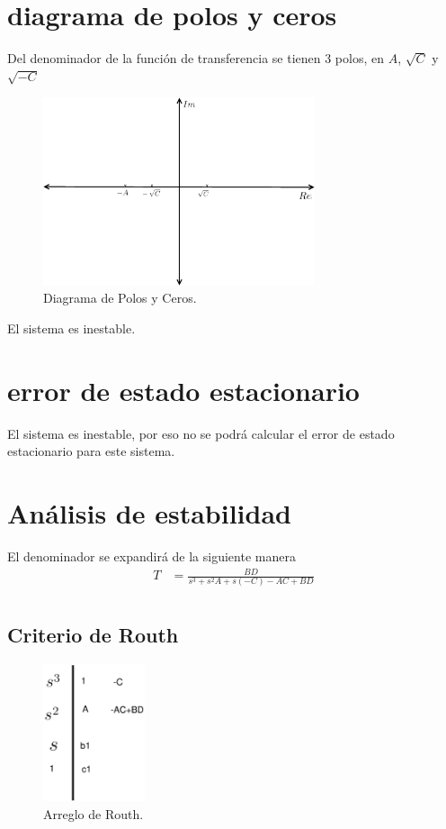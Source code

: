 \documentclass[a4paper]{IEEEtran} %
\begin{document}
\section{diagrama de polos y ceros}
Del denominador de la función de transferencia se tienen 3 polos, en $A$, $\sqrt{C}$ y $\sqrt{-C}$

\begin{figure}[h]
    \centering
        \includegraphics[width=8cm]{images/polos_ceros.eps}
        \caption{Diagrama de Polos y Ceros.}
\end{figure}

El sistema es inestable.
\section{error de estado estacionario}
El sistema es inestable, por eso no se podrá calcular el error de estado estacionario para este sistema.
\section{Análisis de estabilidad}
El denominador se expandirá de la siguiente manera
\begin{equation}
    \begin{split}
        T&=\frac{BD}{s^3+s^2A+s(-C)-AC+BD}\\
    \end{split}
    \label{eq:m_sensiclose}
\end{equation}
\subsection{Criterio de Routh}
\begin{figure}[h]
    \centering
        \includegraphics[width=3cm]{images/routh.eps}
        \caption{Arreglo de Routh.}
\end{figure}
\end{document}
